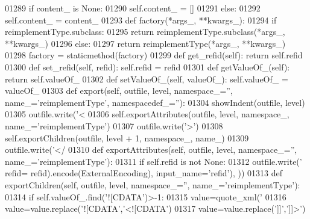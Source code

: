 \begin{DoxyCode}
{{{{{{{{{{{{{{{{{{{{{{{{{{{{{{{{{{{{{{{{{{{{{{{{{{{{{{{{{{{{{{{{{{{{{{{{01289         \textcolor{keywordflow}{if} content\_ \textcolor{keywordflow}{is} \textcolor{keywordtype}{None}:
01290             self.content_ = []
01291         \textcolor{keywordflow}{else}:
01292             self.content_ = content\_
01293     \textcolor{keyword}{def }factory(*args\_, **kwargs\_):
01294         \textcolor{keywordflow}{if} reimplementType.subclass:
01295             \textcolor{keywordflow}{return} reimplementType.subclass(*args\_, **kwargs\_)
01296         \textcolor{keywordflow}{else}:
01297             \textcolor{keywordflow}{return} reimplementType(*args\_, **kwargs\_)
01298     factory = staticmethod(factory)
01299     \textcolor{keyword}{def }get_refid(self): \textcolor{keywordflow}{return} self.refid
01300     \textcolor{keyword}{def }set_refid(self, refid): self.refid = refid
01301     \textcolor{keyword}{def }getValueOf_(self): \textcolor{keywordflow}{return} self.valueOf\_
01302     \textcolor{keyword}{def }setValueOf_(self, valueOf\_): self.valueOf\_ = valueOf\_
01303     \textcolor{keyword}{def }export(self, outfile, level, namespace\_='', name\_='reimplementType', namespacedef\_=''):
01304         showIndent(outfile, level)
01305         outfile.write(\textcolor{stringliteral}{'<%
01306         self.exportAttributes(outfile, level, namespace\_, name\_=\textcolor{stringliteral}{'reimplementType'})
01307         outfile.write(\textcolor{stringliteral}{'>'})
01308         self.exportChildren(outfile, level + 1, namespace\_, name\_)
01309         outfile.write(\textcolor{stringliteral}{'</%
01310     \textcolor{keyword}{def }exportAttributes(self, outfile, level, namespace\_='', name\_='reimplementType'):
01311         \textcolor{keywordflow}{if} self.refid \textcolor{keywordflow}{is} \textcolor{keywordflow}{not} \textcolor{keywordtype}{None}:
01312             outfile.write(\textcolor{stringliteral}{' refid=%
      refid).encode(ExternalEncoding), input\_name=\textcolor{stringliteral}{'refid'}), ))
01313     \textcolor{keyword}{def }exportChildren(self, outfile, level, namespace\_='', name\_='reimplementType'):
01314         \textcolor{keywordflow}{if} self.valueOf\_.find(\textcolor{stringliteral}{'![CDATA'})>-1:
01315             value=quote_xml(\textcolor{stringliteral}{'%
01316             value=value.replace(\textcolor{stringliteral}{'![CDATA'},\textcolor{stringliteral}{'<![CDATA'})
01317             value=value.replace(\textcolor{stringliteral}{']]'},\textcolor{stringliteral}{']]>'})
}}}}}}}}}}}}}}}}}}}}}}}}}}}}}}}}}}}}}}}}}}}}}}}}}}}}}}}}}}}}}}}}}}}}}}}}}}}}
\end{DoxyCode}
